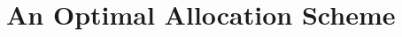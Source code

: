 \documentclass[a4paper]{article}
\theoremstyle{plain}
\theoremstyle{definition}
\theoremstyle{case}
\theoremstyle{remark}
\begin{document}
%






\section{An Optimal Allocation Scheme}
\label{sec: main results}
\end{document}
